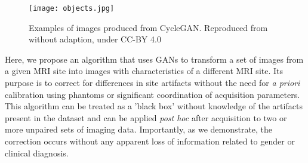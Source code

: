 \begin{figure}[htp]
\begin{center}
 \texttt{[image: objects.jpg]}
    \end{center}
  \caption{Examples of images produced from CycleGAN. Reproduced from  \cite{zhu2017unpaired} without adaption, under CC-BY 4.0 }
  \label{fig:cycle_gan}
\end{figure}

Here, we propose an algorithm that uses GANs to transform a set of images from a given MRI site into images with characteristics of a different MRI site. Its purpose is to correct for differences in site artifacts without the need for \textit{a priori} calibration using phantoms or significant coordination of acquisition parameters. This algorithm can be treated as a ’black box’ without knowledge of the artifacts present in the dataset and can be applied \textit{post hoc} after acquisition to two or more unpaired sets of imaging data. Importantly, as we demonstrate, the correction occurs without any apparent loss of information related to gender or clinical diagnosis.

